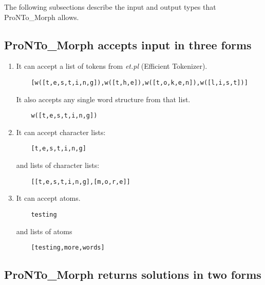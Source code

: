 The following subsections describe the input and output types that
ProNTo\_Morph allows.

\subsection{ProNTo\_Morph accepts input in three forms}

\begin{enumerate}

    \item It can accept a list of tokens from \emph{et.pl} (Efficient
    Tokenizer).
    \begin{verbatim}
    [w([t,e,s,t,i,n,g]),w([t,h,e]),w([t,o,k,e,n]),w([l,i,s,t])]\end{verbatim}

    It also accepts any single word structure from
    that list.
    \begin{verbatim}
    w([t,e,s,t,i,n,g])\end{verbatim}


    \item It can accept character lists:
    \begin{verbatim}
    [t,e,s,t,i,n,g]\end{verbatim}

    and lists of character lists:
    \begin{verbatim}
    [[t,e,s,t,i,n,g],[m,o,r,e]]\end{verbatim}

    \item It can accept atoms.
    \begin{verbatim}
    testing\end{verbatim}

    and lists of atoms
    \begin{verbatim}
    [testing,more,words]\end{verbatim}

\end{enumerate}

\subsection{ProNTo\_Morph returns solutions in two forms}

